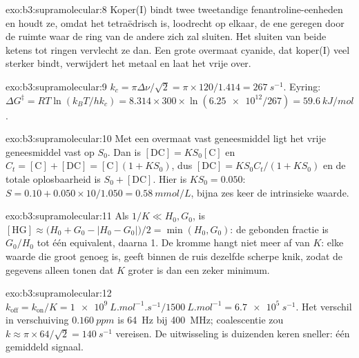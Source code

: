 \begin{solution}{exo:b3:supramolecular:8}
Koper(I) bindt twee tweetandige fenantroline-eenheden en houdt ze, omdat
het tetraëdrisch is, loodrecht op elkaar, de ene geregen door de ruimte
waar de ring van de andere zich zal sluiten. Het sluiten van beide ketens
tot ringen vervlecht ze dan. Een grote overmaat cyanide, dat koper(I) veel
sterker bindt, verwijdert het metaal en laat het vrije  over.
\end{solution}

\begin{solution}{exo:b3:supramolecular:9}
$k_c = \pi\Delta\nu/\sqrt2 = \pi \times 120/1.414 = \qty{267}{s^{-1}}$. Eyring:
$\Delta G^\ddagger = RT\ln(k_BT/hk_c) = 8.314 \times 300 \times \ln(\num{6.25e12}/267) = \qty{59.6}{kJ/mol}$.
\end{solution}

\begin{solution}{exo:b3:supramolecular:10}
Met een overmaat vast geneesmiddel ligt het vrije geneesmiddel vast op $S_0$. Dan is $[\mathrm{DC}] = KS_0[\mathrm C]$ en
$C_t = [\mathrm C] + [\mathrm{DC}] = [\mathrm C](1 + KS_0)$, dus $[\mathrm{DC}] = KS_0C_t/(1 + KS_0)$ en de totale oplosbaarheid is $S_0 + [\mathrm{DC}]$. Hier is
$KS_0 = 0.050$: $S = 0.10 + 0.050 \times 10/1.050 = \qty{0.58}{mmol/L}$, bijna zes keer de intrinsieke waarde.
\end{solution}

\begin{solution}{exo:b3:supramolecular:11}
Als $1/K \ll H_0, G_0$, is $[\mathrm{HG}] \approx \bigl(H_0 + G_0 - |H_0 - G_0|\bigr)/2 = \min(H_0, G_0)$: de gebonden fractie is $G_0/H_0$ tot één
equivalent, daarna 1. De kromme hangt niet meer af van $K$: elke waarde die groot genoeg is,
geeft binnen de ruis dezelfde scherpe knik, zodat de gegevens alleen tonen dat $K$ groter is dan
een zeker minimum.
\end{solution}

\begin{solution}{exo:b3:supramolecular:12}
$k_{\mathrm{off}} = k_{\mathrm{on}}/K = \qty{1e9}{L.mol^{-1}.s^{-1}}/\qty{1500}{L.mol^{-1}} = \qty{6.7e5}{s^{-1}}$. Het verschil in verschuiving
$\qty{0.160}{ppm}$ is \qty{64}{Hz} bij \qty{400}{MHz}; coalescentie zou $k \approx \pi \times 64/\sqrt2 = \qty{140}{s^{-1}}$ vereisen. De uitwisseling is
duizenden keren sneller: één gemiddeld signaal.
\end{solution}

